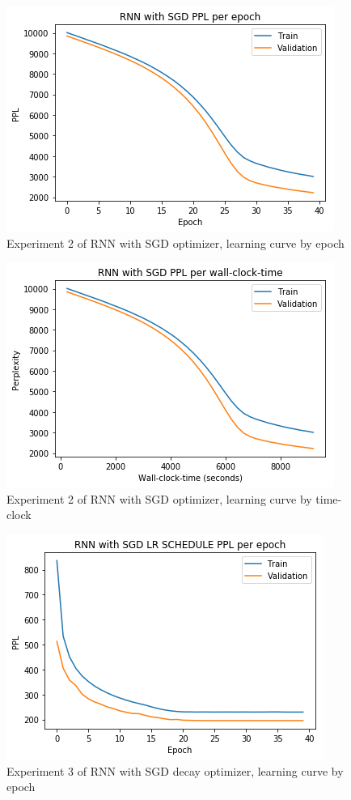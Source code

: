 \begin{itemize}
\begin{figure}[H]
	\centering
	\includegraphics[scale=0.8]{Q4-2_RNN_SGD_epoch.png}
	\caption{Experiment 2 of RNN with SGD optimizer, learning curve by epoch}
	\label{fig:fig7}
\end{figure}

\begin{figure}[H]
	\centering
	\includegraphics[scale=0.8]{Q4-2_RNN_SGD_clock.png}
	\caption{Experiment 2 of RNN with SGD optimizer, learning curve by time-clock}
	\label{fig:fig8}
\end{figure}

\begin{figure}[H]
	\centering
	\includegraphics[scale=0.8]{Q4-2_RNN_SGD_LR_epoch.png}
	\caption{Experiment 3 of RNN with SGD decay optimizer, learning curve by epoch}
	\label{fig:fig9}
\end{figure}


\end{itemize}
